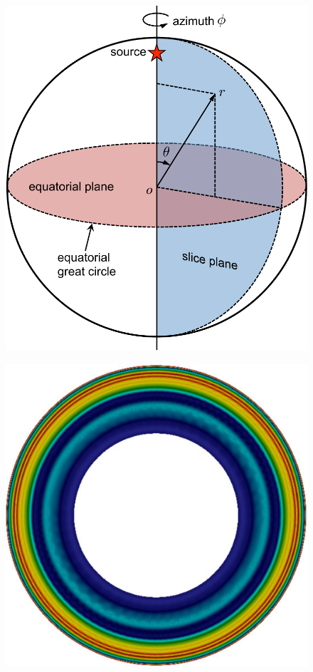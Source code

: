 \documentclass[extra]{gji}
\begin{document}
\begin{figure}
  \centering
  \begin{minipage}{0.4\textwidth}
    \centering
    \includegraphics[width=.9\textwidth]{fig/snapshot/sketch.pdf} 
    \label{fig:sk}
  \end{minipage}%
  \begin{minipage}{0.6\textwidth}
    \begin{minipage}{.585\textwidth}
      \centering
      \includegraphics[height=.85\textwidth]{fig/snapshot/1d-phi.pdf}

\end{minipage}
\end{minipage}
\end{figure}
\end{document}

